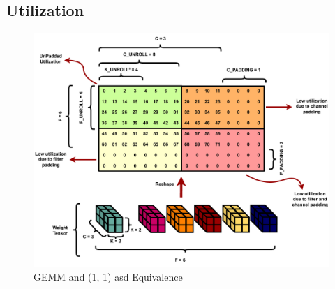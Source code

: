 


\subsection{Utilization}
\label{chap:dataflow_dse:exploring:tempo_model:utilization}

\begin{figure}[]
    \centering
    \includegraphics[scale=0.45]{fig/Lasso_ilus.pdf}
    \caption{\ac{GEMM} and (1, 1) asd Equivalence}
    \label{fig:tempo_model}
\end{figure}

